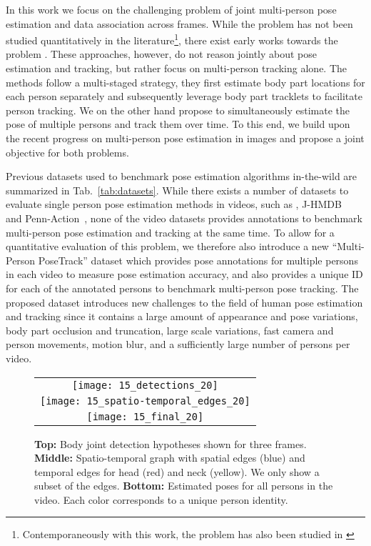 \documentclass[10pt,twocolumn,letterpaper]{article}
\begin{document}
In this work we focus on the challenging problem of joint multi-person pose estimation and data association across frames. While the problem has not been studied quantitatively in the literature\footnote{Contemporaneously with this work, the problem has also been studied in \cite{Insafutdinov:2017:CVPR}}, there exist early works towards the problem \cite{Izadinia:2012:ECCV, Andriluka:2008:CVPR}. These approaches, however, do not reason jointly about pose estimation and tracking, but rather focus on multi-person tracking alone. The methods follow a multi-staged strategy, \ie they first estimate body part locations for each person separately and subsequently leverage body part tracklets to facilitate person tracking. We on the other hand propose to simultaneously estimate the pose of multiple persons and track them over time. To this end, we build upon the recent progress on multi-person pose estimation in images \cite{pishchulin2016deepcut, insafutdinov2016deepercut, Iqbal_ECCVw2016} and propose a joint objective for both problems. 

Previous datasets used to benchmark pose estimation algorithms in-the-wild are summarized in Tab.~\ref{tab:datasets}. While there exists a number of datasets to evaluate single person pose estimation methods in videos, such as \eg, \mbox{J-HMDB}~\cite{Jhuang_iccv2013} and Penn-Action~\cite{zhang2013actemes}, none of the video datasets provides annotations to benchmark multi-person pose estimation and tracking at the same time. To allow for a quantitative evaluation of this problem, we therefore also introduce a new ``Multi-Person PoseTrack'' dataset which provides pose annotations for multiple persons in each video to measure pose estimation accuracy, and also provides a unique ID for each of the annotated persons to benchmark multi-person pose tracking. The proposed dataset introduces new challenges to the field of human pose estimation and tracking since it contains a large amount of appearance and  pose variations, body part occlusion and truncation, large scale variations,  fast camera and person movements, motion blur, and a sufficiently large number of persons per video.   

\begin{figure*}[t]
  \centering
    \begin{tabular}{c}
		\texttt{[image: 15\_detections\_20]} \\
  		\texttt{[image: 15\_spatio-temporal\_edges\_20]} \\
	    \texttt{[image: 15\_final\_20]} \\
    \end{tabular}
  \caption{{\bf Top:} Body joint detection hypotheses shown for three frames. {\bf Middle:} Spatio-temporal graph with spatial edges (blue) and temporal edges for head (red) and neck (yellow). We only show a subset of the edges. {\bf Bottom:} Estimated poses for all persons in the video. Each color corresponds to a unique person identity. 
  }
    \label{fig:overview}
    \vspace{-2mm}
\end{figure*}
\end{document}
